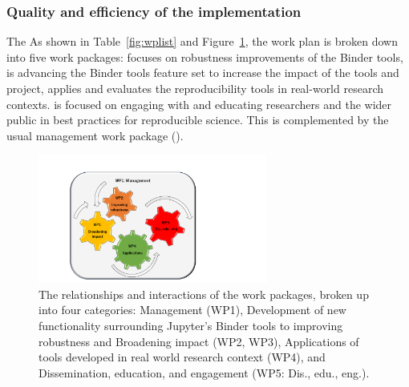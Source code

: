 

\subsubsection{Quality and efficiency of the implementation}\label{sec:workplan-structure}

\ifgrantagreement The \else As shown in Table~\ref{fig:wplist} and
Figure~\ref{fig:workpackages}, the \fi work plan is broken down into five work
packages:  focuses on robustness improvements of the
Binder tools,  is advancing the Binder tools feature set to
increase the impact of the tools and project,  applies and
evaluates the reproducibility tools in real-world research contexts.
 is focused on engaging with and educating researchers and the
wider public in best practices for reproducible science. This is complemented by
the usual management work package ().

\begin{figure}[htb]
  \centering
  \includegraphics[width=0.67\textwidth]{images/WP.pdf}
  \caption{
    \label{fig:workpackages}
    The relationships and interactions of the work packages,
    broken up into four categories: Management (WP1),
    Development of new functionality surrounding Jupyter's Binder tools to improving robustness
    and Broadening impact (WP2, WP3),
    Applications of tools developed in real world research context (WP4),
    and Dissemination, education, and engagement (WP5: Dis., edu., eng.).
  }
\end{figure}

